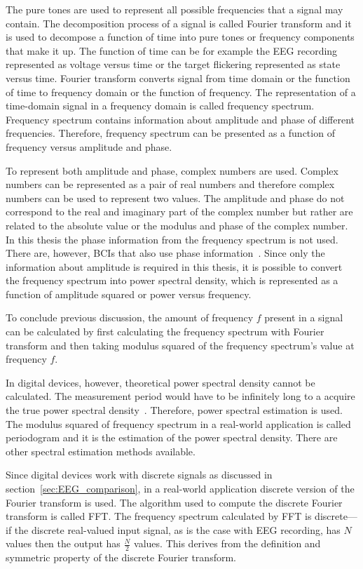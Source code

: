 The pure tones are used to represent all possible frequencies that a signal may contain. The decomposition process of a signal is called Fourier transform and it is used to decompose a function of time into pure tones or frequency components that make it up. The function of time can be for example the \gls{EEG} recording represented as voltage versus time or the target flickering represented as state versus time. Fourier transform converts signal from time domain or the function of time to frequency domain or the function of frequency. The representation of a time-domain signal in a frequency domain is called frequency spectrum. Frequency spectrum contains information about amplitude and phase of different frequencies. Therefore, frequency spectrum can be presented as a function of frequency versus amplitude and phase.

To represent both amplitude and phase, complex numbers are used. Complex numbers can be represented as a pair of real numbers and therefore complex numbers can be used to represent two values. The amplitude and phase do not correspond to the real and imaginary part of the complex number but rather are related to the absolute value or the modulus and phase of the complex number. In this thesis the phase information from the frequency spectrum is not used. There are, however, \glspl{BCI} that also use phase information~\cite{MPCC}. Since only the information about amplitude is required in this thesis, it is possible to convert the frequency spectrum into power spectral density, which is represented as a function of amplitude squared or power versus frequency.

To conclude previous discussion, the amount of frequency $f$ present in a signal can be calculated by first calculating the frequency spectrum with Fourier transform and then taking modulus squared of the frequency spectrum's value at frequency $f$.

In digital devices, however, theoretical power spectral density cannot be calculated. The measurement period would have to be infinitely long to a acquire the true power spectral density~\cite{psd}. Therefore, power spectral estimation is used. The modulus squared of frequency spectrum in a real-world application is called periodogram and it is the estimation of the power spectral density. There are other spectral estimation methods available.

Since digital devices work with discrete signals as discussed in section~\ref{sec:EEG_comparison}, in a real-world application discrete version of the Fourier transform is used. The algorithm used to compute the discrete Fourier transform is called \gls{FFT}. The frequency spectrum calculated by \gls{FFT} is discrete---if the discrete real-valued input signal, as is the case with \gls{EEG} recording, has $N$ values then the output has $\frac{N}{2}$ values. This derives from the definition and symmetric property of the discrete Fourier transform. %

